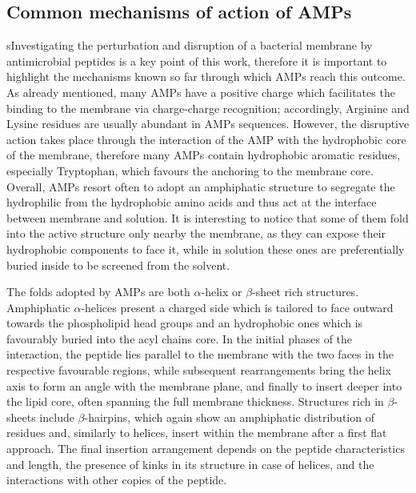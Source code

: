 \documentclass[a4paper,11pt]{extreport}
\begin{document}
\subsection{Common mechanisms of action of AMPs} \label{AMP_mechs}
sInvestigating the perturbation and disruption of a bacterial membrane by antimicrobial peptides is a key point of this work, therefore it is important to highlight the mechanisms known so far through which AMPs reach this outcome.
%
As already mentioned, many AMPs have a positive charge which facilitates the binding to the membrane via charge-charge recognition; accordingly, Arginine and Lysine residues are usually abundant in AMPs sequences. However, the disruptive action takes place through the interaction of the AMP with the hydrophobic core of the membrane, therefore many AMPs contain hydrophobic aromatic residues, especially Tryptophan, which favours the anchoring to the membrane core.\cite{Chan2006}
%
Overall, AMPs resort often to adopt an amphiphatic structure to segregate the hydrophilic from the hydrophobic amino acids and thus act at the interface between membrane and solution. It is interesting to notice that some of them fold into the active structure only nearby the membrane, as they can expose their hydrophobic components to face it, while in solution these ones are preferentially buried inside to be screened from the solvent.\cite{Nguyen2011}

The folds adopted by AMPs are both $\alpha$-helix or $\beta$-sheet rich structures. Amphiphatic $\alpha$-helices present a charged side which is tailored to face outward towards the phospholipid head groups and an hydrophobic ones which is favourably buried into the acyl chains core. In the initial phases of the interaction, the peptide lies parallel to the membrane with the two faces in the respective favourable regions, while subsequent rearrangements bring the helix axis to form an angle with the membrane plane, and finally to insert deeper into the lipid core, often spanning the full membrane thickness.\cite{Ebenhan2014}
%
Structures rich in $\beta$-sheets include $\beta$-hairpins, which again show an amphiphatic distribution of residues and, similarly to helices, insert within the membrane after a first flat approach.
%
The final insertion arrangement depends on the peptide characteristics and length, the presence of kinks in its structure in case of helices, and the interactions with other copies of the peptide.
\end{document}
